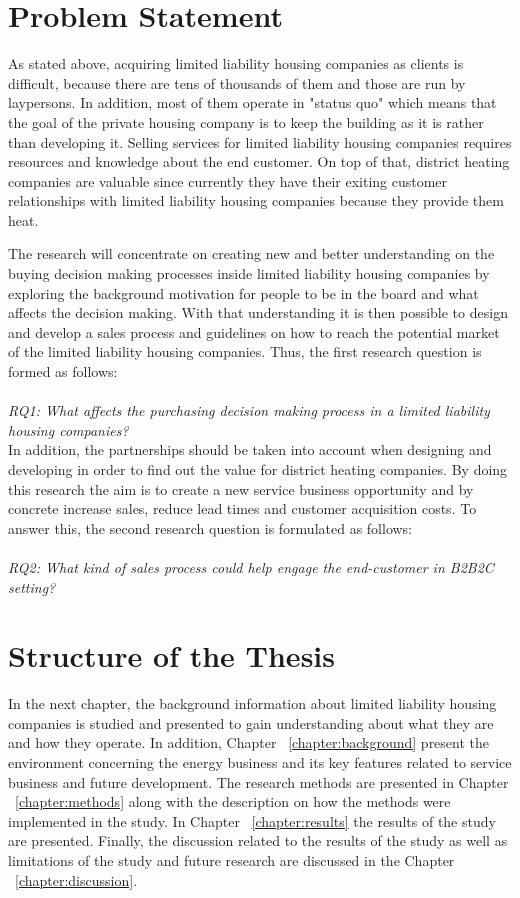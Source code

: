 \section{Problem Statement}

As stated above, acquiring limited liability housing companies as clients is difficult, because there are tens of thousands of them and those are run by laypersons. In addition, most of them operate in "status quo" which means that the goal of the private housing company is to keep the building as it is rather than developing it. Selling services for limited liability housing companies requires resources and knowledge about the end customer. On top of that, district heating companies are valuable since currently they have their exiting customer relationships with limited liability housing companies because they provide them heat.

The research will concentrate on creating new and better understanding on the buying decision making processes inside limited liability housing companies by exploring the background motivation for people to be in the board and what affects the decision making. With that understanding it is then possible to design and develop a sales process and guidelines on how to reach the potential market of the limited liability housing companies. Thus, the first research question is formed as follows:\\\\
\emph{RQ1: What affects the purchasing decision making process in a limited liability housing companies?}\\

In addition, the partnerships should be taken into account when designing and developing in order to find out the value for district heating companies. By doing this research the aim is to create a new service business opportunity and by concrete increase sales, reduce lead times and customer acquisition costs. To answer this, the second research question is formulated as follows:\\\\
\emph{RQ2: What kind of sales process could help engage the end-customer in B2B2C setting?}\\

\section{Structure of the Thesis}
\label{section:structure} 

In the next chapter, the background information about limited liability housing companies is studied and presented to gain understanding about what they are and how they operate. In addition, Chapter ~\ref{chapter:background} present the environment concerning the energy business and its key features related to service business and future development. The research methods are presented in Chapter ~\ref{chapter:methods} along with the description on how the methods were implemented in the study. In Chapter ~\ref{chapter:results} the results of the study are presented. Finally, the discussion related to the results of the study as well as limitations of the study and future research are discussed in the Chapter ~\ref{chapter:discussion}.